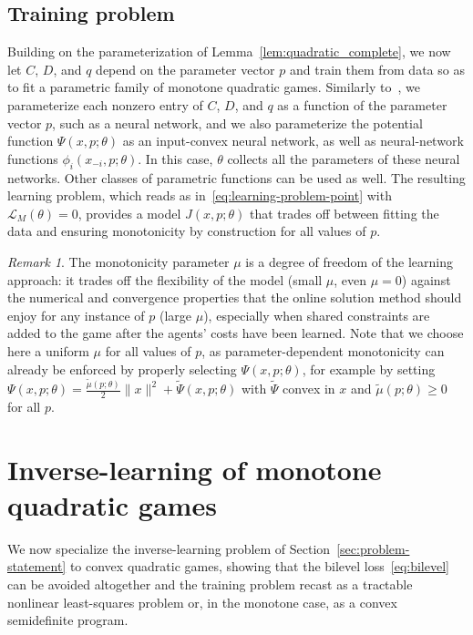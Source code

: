 \documentclass[11pt, a4paper]{article}
\newcommand{\LL}{\mathcal{L}}
\theoremstyle{remark}
\newtheorem{remark}[theorem]{Remark}
\theoremstyle{plain}
\begin{document}
\subsection{Training problem}
Building on the parameterization of Lemma~\ref{lem:quadratic_complete}, we now let $C$, $D$, and $q$ depend on the parameter vector $p$ and train them from data so as to fit a parametric family of monotone quadratic games.
Similarly to~\cite{SBB25}, we parameterize each nonzero entry of $C$, $D$, and $q$ as a function of the parameter vector $p$, such as a neural network, and we also parameterize the potential function $\Psi(x,p;\theta)$ as an input-convex neural network, as well as neural-network functions $\phi_i(x_{-i},p;\theta)$. 
In this case, $\theta$ collects all the parameters of these neural networks. Other classes of parametric functions can be used as well.
The resulting learning problem, which reads as in~\eqref{eq:learning-problem-point}
with $\LL_M(\theta)=0$, provides a model $J(x,p;\theta)$ that trades off between fitting the data and ensuring monotonicity by construction for all values of $p$.

\begin{remark}
The monotonicity parameter $\mu$ is a degree of freedom of the learning approach: it trades off the flexibility of the model (small $\mu$, even $\mu=0$) against the numerical and convergence properties that the online solution method should enjoy for any instance of $p$ (large $\mu$), especially when shared constraints are added to the game after the agents' costs have been learned. Note that we choose here a uniform $\mu$ for all values of $p$, as parameter-dependent monotonicity can already be enforced by properly selecting $\Psi(x,p;\theta)$, for example by setting $\Psi(x,p;\theta)=\frac{\tilde\mu(p;\theta)}{2}\|x\|^2+\tilde\Psi(x,p;\theta)$ with $\tilde\Psi$ convex in $x$ and $\tilde\mu(p;\theta)\geq 0$ for all $p$.
\end{remark}

\section{Inverse-learning of monotone quadratic games}
\label{sec:inverse-quadratic}

We now specialize the inverse-learning problem of Section~\ref{sec:problem-statement} to convex quadratic games, showing that the bilevel loss~\eqref{eq:bilevel} can be avoided altogether and the training problem recast as a tractable nonlinear least-squares problem or, in the monotone case, as a convex semidefinite program.
\end{document}
